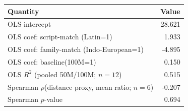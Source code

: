 \begin{tabular}{@{}lr@{}}
\toprule
Quantity & Value \\
\midrule
OLS intercept & 28.621 \\
OLS coef: script-match (Latin=1) & 1.933 \\
OLS coef: family-match (Indo-European=1) & -4.895 \\
OLS coef: baseline(100M=1) & 0.150 \\
OLS $R^2$ (pooled 50M/100M; $n=12$) & 0.515 \\
Spearman $\rho$(distance proxy, mean ratio; $n=6$) & -0.207 \\
Spearman $p$-value & 0.694 \\
\bottomrule
\end{tabular}
